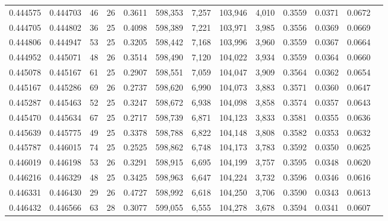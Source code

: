 \begin{tabular}{rrrrrrrrrrrrr}
0.444575 & 0.444703 &    46 &  26 &                                     0.3611 & 598,353 &   7,257 & 103,946 &   4,010 & 0.3559 & 0.0371 & 0.0672 \\
0.444705 & 0.444802 &    36 &  25 &                                     0.4098 & 598,389 &   7,221 & 103,971 &   3,985 & 0.3556 & 0.0369 & 0.0669 \\
0.444806 & 0.444947 &    53 &  25 &                                     0.3205 & 598,442 &   7,168 & 103,996 &   3,960 & 0.3559 & 0.0367 & 0.0664 \\
0.444952 & 0.445071 &    48 &  26 &                                     0.3514 & 598,490 &   7,120 & 104,022 &   3,934 & 0.3559 & 0.0364 & 0.0660 \\
0.445078 & 0.445167 &    61 &  25 &                                     0.2907 & 598,551 &   7,059 & 104,047 &   3,909 & 0.3564 & 0.0362 & 0.0654 \\
0.445167 & 0.445286 &    69 &  26 &                                     0.2737 & 598,620 &   6,990 & 104,073 &   3,883 & 0.3571 & 0.0360 & 0.0647 \\
0.445287 & 0.445463 &    52 &  25 &                                     0.3247 & 598,672 &   6,938 & 104,098 &   3,858 & 0.3574 & 0.0357 & 0.0643 \\
0.445470 & 0.445634 &    67 &  25 &                                     0.2717 & 598,739 &   6,871 & 104,123 &   3,833 & 0.3581 & 0.0355 & 0.0636 \\
0.445639 & 0.445775 &    49 &  25 &                                     0.3378 & 598,788 &   6,822 & 104,148 &   3,808 & 0.3582 & 0.0353 & 0.0632 \\
0.445787 & 0.446015 &    74 &  25 &                                     0.2525 & 598,862 &   6,748 & 104,173 &   3,783 & 0.3592 & 0.0350 & 0.0625 \\
0.446019 & 0.446198 &    53 &  26 &                                     0.3291 & 598,915 &   6,695 & 104,199 &   3,757 & 0.3595 & 0.0348 & 0.0620 \\
0.446216 & 0.446329 &    48 &  25 &                                     0.3425 & 598,963 &   6,647 & 104,224 &   3,732 & 0.3596 & 0.0346 & 0.0616 \\
0.446331 & 0.446430 &    29 &  26 &                                     0.4727 & 598,992 &   6,618 & 104,250 &   3,706 & 0.3590 & 0.0343 & 0.0613 \\
0.446432 & 0.446566 &    63 &  28 &                                     0.3077 & 599,055 &   6,555 & 104,278 &   3,678 & 0.3594 & 0.0341 & 0.0607 \\

\end{tabular}
